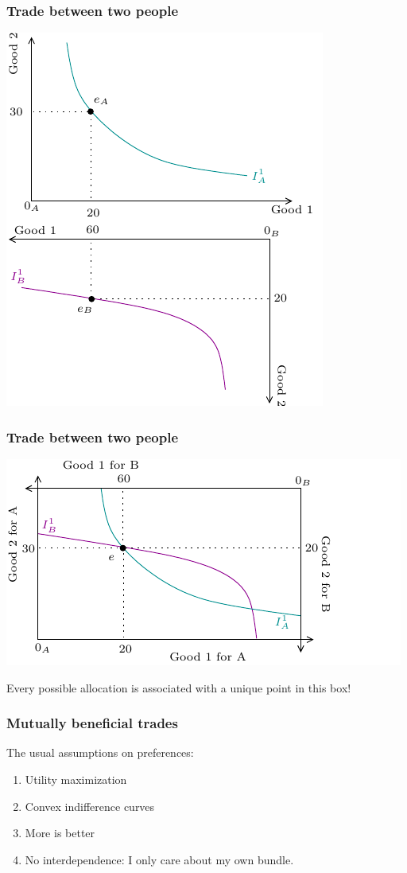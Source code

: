 \documentclass[xcolor=pdftex,dvipsnames]{beamer}
\begin{document}
\begin{frame}
\frametitle{Trade between two people}
\begin{center}
\includegraphics{pics/Edgeworth3}
\end{center}

\end{frame}

\begin{frame}
\frametitle{Trade between two people}
\begin{center}
\includegraphics{pics/Edgeworth4}
\end{center}
Every possible allocation is associated with a unique point in this box!
\end{frame}


\begin{frame}
\frametitle{Mutually beneficial trades}
The usual assumptions on preferences:
\begin{enumerate}
\item Utility maximization
\item Convex indifference curves
\item More is better
\item No interdependence: I only care about my own bundle.
\end{enumerate}
\end{frame}
\end{document}
